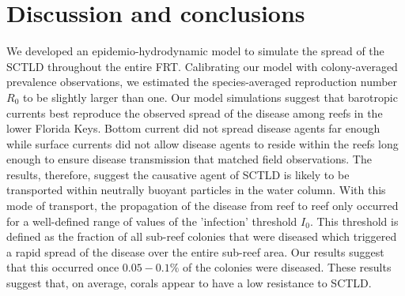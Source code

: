 \section{Discussion and conclusions}


We developed an epidemio-hydrodynamic model to simulate the spread of the SCTLD throughout the entire FRT. Calibrating our model with colony-averaged prevalence observations, we estimated the species-averaged reproduction number $R_0$ to be slightly larger than one. Our model simulations suggest that barotropic currents best reproduce the observed spread of the disease among reefs in the lower Florida Keys. Bottom current did not spread disease agents far enough while surface currents did not allow disease agents to reside within the reefs long enough to ensure disease transmission that matched field observations. The results, therefore, suggest the causative agent of SCTLD is likely to be transported within neutrally buoyant particles in the water column. With this mode of transport, the propagation of the disease from reef to reef only occurred for a well-defined range of values of the 'infection' threshold $I_0$. This threshold is defined as the fraction of all sub-reef colonies that were diseased which triggered a rapid spread of the disease over the entire sub-reef area. Our results suggest that this occurred once $0.05-0.1\%$ of the colonies were diseased. These results suggest that, on average, corals appear to have a low resistance to SCTLD.


